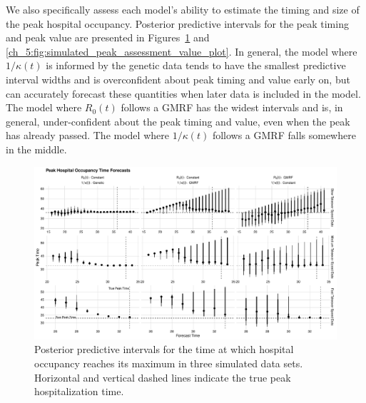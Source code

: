 We also specifically assess each model's ability to estimate the timing and size of the peak hospital occupancy.
Posterior predictive intervals for the peak timing and peak value are presented in Figures~\ref{ch_5:fig:simulated_peak_assessment_time_plot} and \ref{ch_5:fig:simulated_peak_assessment_value_plot}.
In general, the model where \( 1 / \kappa(t) \) is informed by the genetic data tends to have the smallest predictive interval widths and is overconfident about peak timing and value early on, but can accurately forecast these quantities when later data is included in the model.
The model where \( R_0(t) \) follows a GMRF has the widest intervals and is, in general, under-confident about the peak timing and value, even when the peak has already passed.
The model where \( 1 / \kappa(t) \) follows a GMRF falls somewhere in the middle.

\begin{figure}
    \centering
    \includegraphics[width=1.0\columnwidth]{simulated_peak_assessment_time_plot}
    \caption[Posterior predictive intervals for peak hospital occupancy timing for simulated data sets.]{Posterior predictive intervals for the time at which hospital occupancy reaches its maximum in three simulated data sets.
    Horizontal and vertical dashed lines indicate the true peak hospitalization time.}
    \label{ch_5:fig:simulated_peak_assessment_time_plot}
\end{figure}

